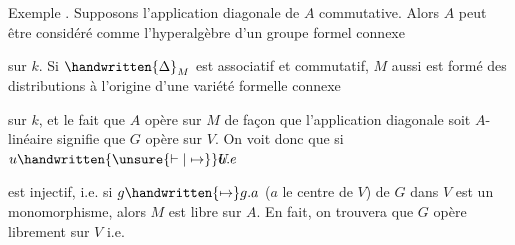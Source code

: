 Exemple . Supposons l'application diagonale de $A$ commutative. Alors $A$ peut être considéré comme l'hyperalgèbre d'un groupe formel connexe  sur $k$. Si $\handwritten{\Delta}_{M}$ est associatif et commutatif, $M$ aussi est formé des distributions à l'origine d'une variété formelle connexe  sur $k$, et le fait que $A$ opère sur $M$ de façon que l'application diagonale soit $A$-linéaire signifie que $G$ opère sur $V$. On voit donc que si $u\handwritten{\unsure{\vdash|\mapsto}}\rlap{\(U\)}u.e$  est injectif, i.e. si $g\handwritten{\mapsto}g.a$ ($a$ le centre de $V$) de $G$ dans $V$ est un monomorphisme, alors $M$ est libre sur $A$. En fait, on trouvera que $G$ opère librement sur $V$ i.e.
